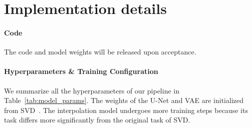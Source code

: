 \section{Implementation details}

\paragraph{Code}

The code and model weights will be released upon acceptance.

\paragraph{Hyperparameters \& Training Configuration}




We summarize all the hyperparameters of our pipeline in Table~\ref{tab:model_params}. The weights of the U-Net and VAE are initialized from SVD~\cite{blattmann2023stablevideodiffusionscaling}. The interpolation model undergoes more training steps because its task differs more significantly from the original task of SVD.

